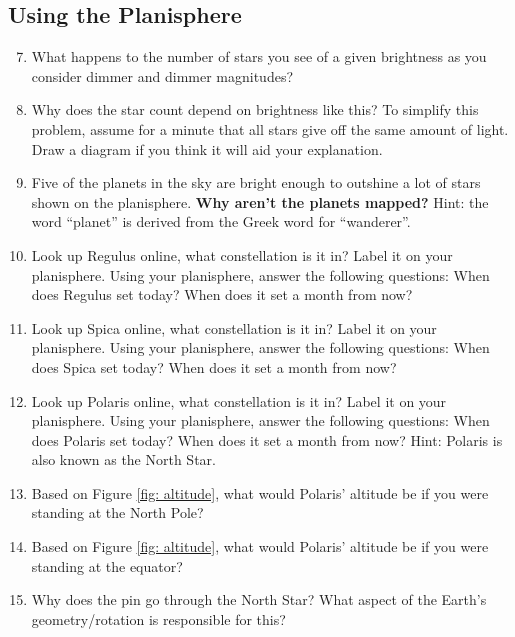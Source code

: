 \documentclass[11pt]{article}
\begin{document}
\subsection{Using the Planisphere}
\begin{enumerate}
    \setcounter{enumi}{6}
    \item What happens to the number of stars you see of a given brightness as you consider dimmer and dimmer magnitudes?
    
    \item Why does the star count depend on brightness like this? To simplify this problem, assume for a minute that all stars give off the same amount of light.  Draw a diagram if you think it will aid your explanation.
    
    \item Five of the planets in the sky are bright enough to outshine a lot of stars shown on the planisphere. \textbf{Why aren't the planets mapped?} Hint: the word ``planet'' is derived from the Greek word for ``wanderer''.
    
    \item Look up Regulus online, what constellation is it in? Label it on your planisphere. Using your planisphere, answer the following questions: When does Regulus set today? When does it set a month from now?
    
    \item Look up Spica online, what constellation is it in? Label it on your planisphere. Using your planisphere, answer the following questions: When does Spica set today? When does it set a month from now?
    
    \item Look up Polaris online, what constellation is it in? Label it on your planisphere. Using your planisphere, answer the following questions: When does Polaris set today? When does it set a month from now? Hint: Polaris is also known as the North Star.
    
    \item Based on Figure \ref{fig: altitude}, what would Polaris' altitude be if you were standing at the North Pole?
    
    \item Based on Figure \ref{fig: altitude}, what would Polaris' altitude be if you were standing at the equator?
    
    \item Why does the pin go through the North Star?  What aspect of the Earth's geometry/rotation is responsible for this?
\end{enumerate}
\end{document}
